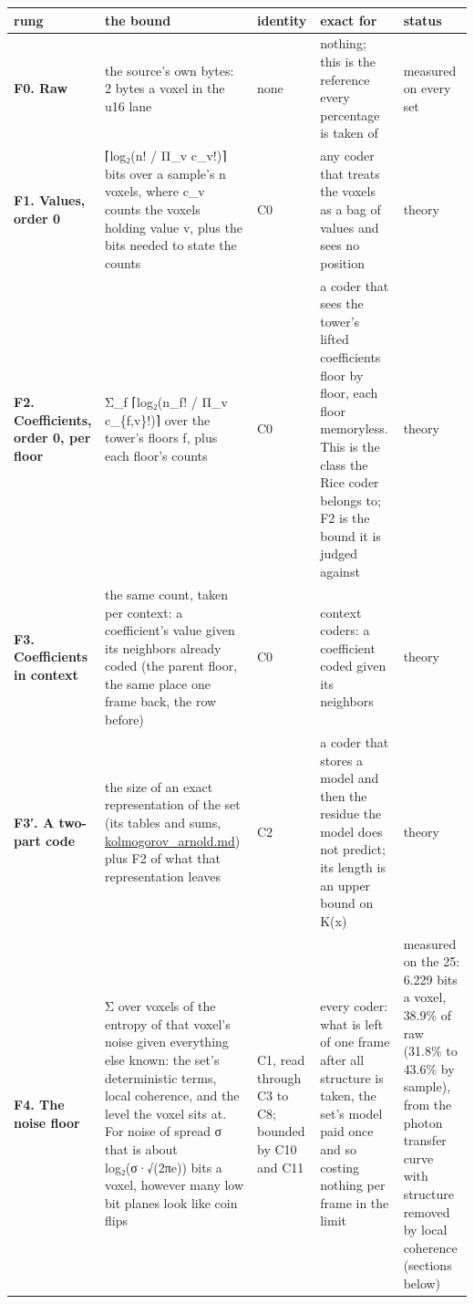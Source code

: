 {\footnotesize
\setlength{\tabcolsep}{6pt}
\begin{longtable}{>{\RaggedRight\arraybackslash}p{}>{\RaggedRight\arraybackslash}p{}>{\RaggedRight\arraybackslash}p{}>{\RaggedRight\arraybackslash}p{}>{\RaggedRight\arraybackslash}p{}}
\toprule
rung & the bound & identity & exact for & status \\
\midrule
\endhead
\textbf{F0. Raw} & the source's own bytes: 2 bytes a voxel in the u16 lane & none & nothing; this is the reference every percentage is taken of & measured on every set \\
\textbf{F1. Values, order 0} & ⌈log₂(n! / Π\_\allowbreak{}v c\_\allowbreak{}v!)⌉ bits over a sample's n voxels, where c\_\allowbreak{}v counts the voxels holding value v, plus the bits needed to state the counts & C0 & any coder that treats the voxels as a bag of values and sees no position & theory \\
\textbf{F2. Coefficients, order 0, per floor} & Σ\_\allowbreak{}f ⌈log₂(n\_\allowbreak{}f! / Π\_\allowbreak{}v c\_\allowbreak{}\{f,v\}!)⌉ over the tower's floors f, plus each floor's counts & C0 & a coder that sees the tower's lifted coefficients floor by floor, each floor memoryless. This is the class the Rice coder belongs to; F2 is the bound it is judged against & theory \\
\textbf{F3. Coefficients in context} & the same count, taken per context: a coefficient's value given its neighbors already coded (the parent floor, the same place one frame back, the row before) & C0 & context coders: a coefficient coded given its neighbors & theory \\
\textbf{F3′. A two-part code} & the size of an exact representation of the set (its tables and sums, \hyperref[chap:kolmogorov-arnold]{kolmogorov\_\allowbreak{}arnold.md}) plus F2 of what that representation leaves & C2 & a coder that stores a model and then the residue the model does not predict; its length is an upper bound on K(x) & theory \\
\textbf{F4. The noise floor} & Σ over voxels of the entropy of that voxel's noise given everything else known: the set's deterministic terms, local coherence, and the level the voxel sits at. For noise of spread σ that is about log₂(σ·√(2πe)) bits a voxel, however many low bit planes look like coin flips & C1, read through C3 to C8; bounded by C10 and C11 & every coder: what is left of one frame after all structure is taken, the set's model paid once and so costing nothing per frame in the limit & measured on the 25: 6.229 bits a voxel, 38.9\% of raw (31.8\% to 43.6\% by sample), from the photon transfer curve with structure removed by local coherence (sections below) \\

\end{longtable}}
